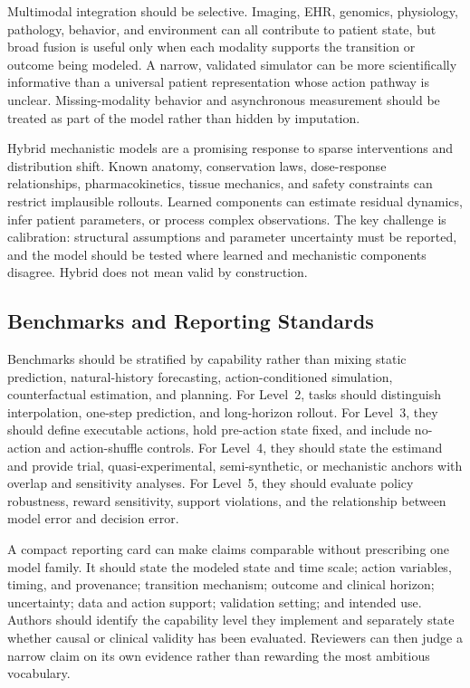 Multimodal integration should be selective. Imaging, EHR, genomics, physiology, pathology, behavior, and environment can all contribute to patient state, but broad fusion is useful only when each modality supports the transition or outcome being modeled. A narrow, validated simulator can be more scientifically informative than a universal patient representation whose action pathway is unclear. Missing-modality behavior and asynchronous measurement should be treated as part of the model rather than hidden by imputation.

Hybrid mechanistic models are a promising response to sparse interventions and distribution shift. Known anatomy, conservation laws, dose-response relationships, pharmacokinetics, tissue mechanics, and safety constraints can restrict implausible rollouts. Learned components can estimate residual dynamics, infer patient parameters, or process complex observations. The key challenge is calibration: structural assumptions and parameter uncertainty must be reported, and the model should be tested where learned and mechanistic components disagree. Hybrid does not mean valid by construction.

\subsection{Benchmarks and Reporting Standards}

Benchmarks should be stratified by capability rather than mixing static prediction, natural-history forecasting, action-conditioned simulation, counterfactual estimation, and planning. For Level~2, tasks should distinguish interpolation, one-step prediction, and long-horizon rollout. For Level~3, they should define executable actions, hold pre-action state fixed, and include no-action and action-shuffle controls. For Level~4, they should state the estimand and provide trial, quasi-experimental, semi-synthetic, or mechanistic anchors with overlap and sensitivity analyses. For Level~5, they should evaluate policy robustness, reward sensitivity, support violations, and the relationship between model error and decision error.

A compact reporting card can make claims comparable without prescribing one model family. It should state the modeled state and time scale; action variables, timing, and provenance; transition mechanism; outcome and clinical horizon; uncertainty; data and action support; validation setting; and intended use. Authors should identify the capability level they implement and separately state whether causal or clinical validity has been evaluated. Reviewers can then judge a narrow claim on its own evidence rather than rewarding the most ambitious vocabulary.

